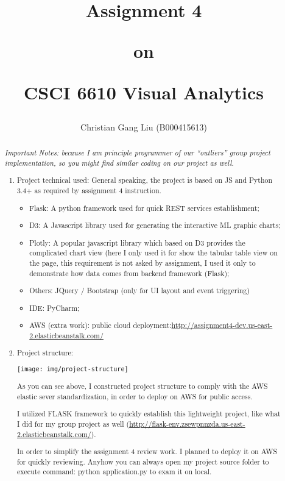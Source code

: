 \documentclass[]{report}
\title{Assignment 4
	
	on
	
	CSCI 6610 Visual Analytics
}
\author{Christian Gang Liu (B000415613)}
\begin{document}
\maketitle

\begin{abstract}
	
{\em Important Notes: because I am principle programmer of our “outliers” group project implementation, so you might find similar coding on our project as well. }

\begin{enumerate}
\item Project technical used:
General speaking, the project is based on JS and Python 3.4+ as required by assignment 4 instruction.
\begin{itemize}
\item Flask: A python framework used for quick REST services establishment;
\item D3: A Javascript library used for generating the interactive ML graphic charts;
\item Plotly: A popular javascript library which based on D3 provides the complicated chart view (here I only used it for show the tabular table view on the page, this requirement is not asked by assignment, I used it only to demonstrate how data comes from backend framework (Flask);
\item Others: JQuery / Bootstrap (only for UI layout and event triggering) 
\item IDE: PyCharm;
\item AWS (extra work): public cloud deployment:\url{http://assignment4-dev.us-east-2.elasticbeanstalk.com/}
\end{itemize}

\item Project structure: 

\texttt{[image: img/project-structure]}

As you can see above, I constructed project structure to comply with the AWS elastic sever standardization, in order to deploy on AWS for public access.

I utilized FLASK framework to quickly establish this lightweight project, like what I did for my group project as well (\url{http://flask-env.zsewpnnzda.us-east-2.elasticbeanstalk.com/}).

In order to simplify the assignment 4 review work. I planned to deploy it on AWS for quickly reviewing. Anyhow you can always open my project source folder to execute command: python application.py to exam it on local.


\end{enumerate}
\end{abstract}
\end{document}
